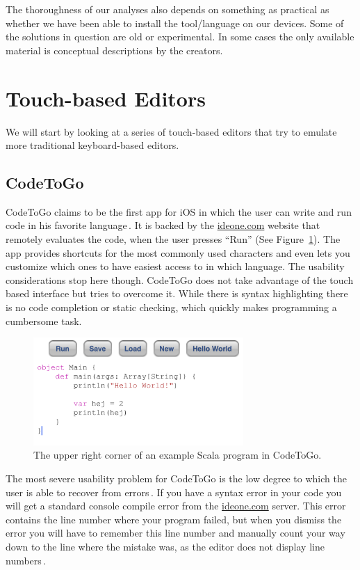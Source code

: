 The thoroughness of our analyses also depends on something as practical as whether we have been able to install the tool/language on our devices.
Some of the solutions in question are old or experimental.
In some cases the only available material is conceptual descriptions by the creators.

\section{Touch-based Editors}
\label{subsec:TouchBasedEditors}
We will start by looking at a series of touch-based editors that try to emulate more traditional keyboard-based editors. 

\subsection{CodeToGo}
\label{subsub:CodeToGo}
CodeToGo claims to be the first app for iOS in which the user can write and run code in his favorite language\,\cite{codetogo}. It is backed by the \url{ideone.com} website\cite{ideone} that remotely evaluates the code, when the user presses ``Run'' (See Figure~\ref{fig:CodeToGo_screenshot}). The app provides shortcuts for the most commonly used characters and even lets you customize which ones to have easiest access to in which language. The usability considerations stop here though. CodeToGo does not take advantage of the touch based interface but tries to overcome it. While there is syntax highlighting there is no code completion or static checking, which quickly makes programming a cumbersome task.

\begin{figure}
	\centering
		\includegraphics[width=80mm]{diagrams/CodeToGo_screenshot.PNG}
	\caption{The upper right corner of an example Scala program in CodeToGo.}
\label{fig:CodeToGo_screenshot}
\end{figure}

The most severe usability problem for CodeToGo is the low degree to which the user is able to recover from errors\,\cite{nielsen1990heuristic}. 
If you have a syntax error in your code you will get a standard console compile error from the \url{ideone.com} server. 
This error contains the line number where your program failed, but when you dismiss the error you will have to remember this line number and manually count your way down to the line where the mistake was, as the editor does not display line numbers\,\cite{nielsen1990heuristic}.

